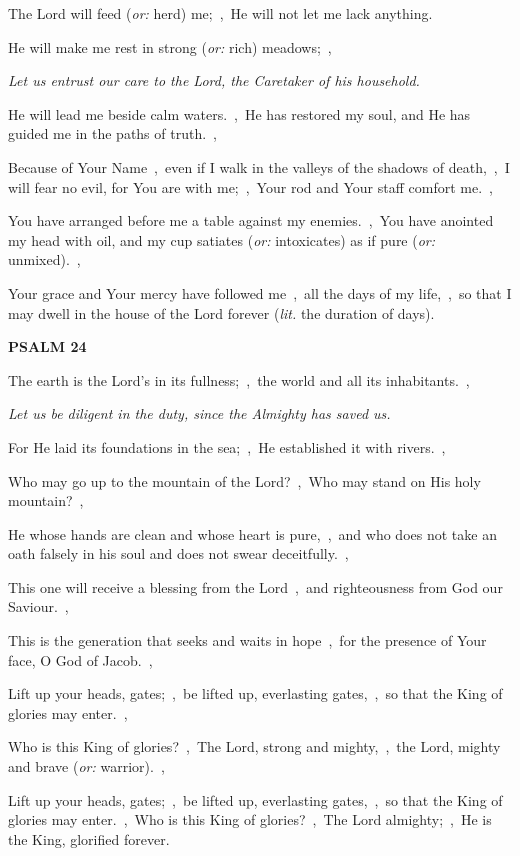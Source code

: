 \documentclass[12pt,twoside,a5paper]{article}
\newcommand{\psalm}[1]{\textbf{PSALM {#1}}\nopagebreak}
\newcommand{\qanona}[1]{{\liturgicalhint{Qanona.} \emph{#1}}}
\newcommand{\translationoption}[1]{\emph{or:} #1}
\newcommand{\translationliteral}[1]{\emph{lit.} #1}
\begin{document}
\begin{normalparskip}
  The Lord will feed (\translationoption{herd}) me;~\sep\ He will not let me lack anything.

  He will make me rest in strong (\translationoption{rich}) meadows;~\sep

  \qanona{Let us entrust our care to the Lord, the Caretaker of his household.}

  He will lead me beside calm waters.~\sep\ He has restored my soul, and He has guided me in the paths of truth.~\sep

  Because of Your Name~\sep\ even if I walk in the valleys of the shadows of death,~\sep\ I will fear no evil, for You are with me;~\sep\ Your rod and Your staff comfort me.~\sep

  You have arranged before me a table against my enemies.~\sep\ You have anointed my head with oil, and my cup satiates (\translationoption{intoxicates}) as if pure (\translationoption{unmixed}).~\sep

  Your grace and Your mercy have followed me~\sep\ all the days of my life,~\sep\ so that I may dwell in the house of the Lord forever (\translationliteral{the duration of days}).
\end{normalparskip}

\psalm{24}

\begin{normalparskip}
  The earth is the Lord's in its fullness;~\sep\ the world and all its inhabitants.~\sep

  \qanona{Let us be diligent in the duty, since the Almighty has saved us.}

  For He laid its foundations in the sea;~\sep\ He established it with rivers.~\sep

  Who may go up to the mountain of the Lord?~\sep\ Who may stand on His holy mountain?~\sep

  He whose hands are clean and whose heart is pure,~\sep\ and who does not take an oath falsely in his soul and does not swear deceitfully.~\sep

  This one will receive a blessing from the Lord~\sep\ and righteousness from God our Saviour.~\sep

  This is the generation that seeks and waits in hope~\sep\ for the presence of Your face, O God of Jacob.~\sep

  Lift up your heads, gates;~\sep\ be lifted up, everlasting gates,~\sep\ so that the King of glories may enter.~\sep

  Who is this King of glories?~\sep\ The Lord, strong and mighty,~\sep\ the Lord, mighty and brave (\translationoption{warrior}).~\sep

  Lift up your heads, gates;~\sep\ be lifted up, everlasting gates,~\sep\ so that the King of glories may enter.~\sep\ Who is this King of glories?~\sep\ The Lord almighty;~\sep\ He is the King, glorified forever.
\end{normalparskip}
\end{document}
